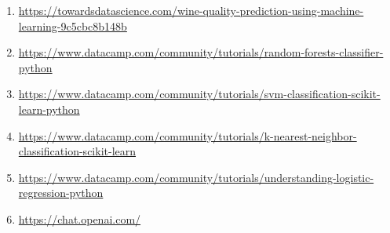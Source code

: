 \documentclass{article}
\begin{document}
\begin{enumerate}
  \item \url{https://towardsdatascience.com/wine-quality-prediction-using-machine-learning-9c5cbc8b148b}
  \item \url{https://www.datacamp.com/community/tutorials/random-forests-classifier-python}
  \item \url{https://www.datacamp.com/community/tutorials/svm-classification-scikit-learn-python}
  \item \url{https://www.datacamp.com/community/tutorials/k-nearest-neighbor-classification-scikit-learn}
  \item \url{https://www.datacamp.com/community/tutorials/understanding-logistic-regression-python}
  \item \url{https://chat.openai.com/}
\end{enumerate}
\end{document}
